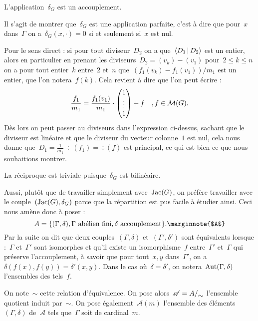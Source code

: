 	\begin{prop}
		L'application~$\delta_G$ est un accouplement.
	\end{prop}
	\begin{dem}
		Il s'agit de montrer que~$\delta_G$ est une application parfaite, c'est à dire que pour~$x$ dans~$\Gamma$ on a~$\delta_G(x,\cdot) = 0$ si et seulement si~$x$ est nul.
		
		Pour le sens direct : si pour tout diviseur~$D_2$ on a que~$\left<D_1\,|\,D_2\right>$ est un entier, alors en particulier en prenant les diviseurs~$D_2 = (v_k) - (v_1)$ pour~$2\leq k \leq n$ on a pour tout entier~$k$ entre~$2$ et~$n$ que~$(f_1(v_k)-f_1(v_1))/m_1$ est un entier, que l'on notera~$f(k)$. Cela revient à dire que l'on peut écrire :
		\[
			\frac{f_1}{m_1} = \frac{f_1(v_1)}{m_1} \cdot \begin{pmatrix} 1 \\ \vdots \\ 1 \end{pmatrix} + f \quad , f\in\mathcal{M}(G).
		\]
		Dès lors on peut passer au diviseurs dans l'expression ci-dessus, sachant que le diviseur est linéaire et que le diviseur du vecteur colonne~$1$ est nul, cela nous donne que~$D_1 = \frac{1}{m_1}\div(f_1) = \div(f)$ est principal, ce qui est bien ce que nous souhaitions montrer.
		
		La réciproque est triviale puisque~$\delta_G$ est bilinéaire.
	\end{dem}
	Aussi, plutôt que de travailler simplement avec~$\operatorname{Jac}(G)$, on préfère travailler avec le couple~$(\operatorname{Jac}(G),\delta_G)$ parce que la répartition est pus facile à étudier ainsi. Ceci nous amène donc à poser :
	\[
		A = \{(\Gamma,\delta), \Gamma\text{ abélien fini}, \delta\text{ accouplement}\}.\text{\marginnote{$A$}}
	\]
	Par la suite on dit que deux couples~$(\Gamma,\delta)$ et~$(\Gamma',\delta')$ sont équivalents lorsque :~$\Gamma$ et~$\Gamma'$ sont isomorphes et qu'il existe un isomorphisme~$f$ entre~$\Gamma'$ et~$\Gamma$ qui préserve l'accouplement, à savoir que pour tout~$x,y$ dans~$\Gamma'$, on a~$\delta(f(x),f(y)) = \delta'(x,y)$. Dans le cas où~$\delta = \delta'$, on notera~$\Aut(\Gamma,\delta)$\marginnote{$\Aut(\Gamma,\delta)$} l'ensembles des tels~$f$.
	
	On note~$\sim$ cette relation d'équivalence. On pose alors~$\mathscr{A} = \quotient{A}{\sim}$ l'ensemble quotient induit par~$\sim$. On pose également~$\mathscr{A}(m)$  l'ensemble des éléments~$(\Gamma,\delta)$ de~$\mathscr{A}$ tels que~$\Gamma$ soit de cardinal~$m$.